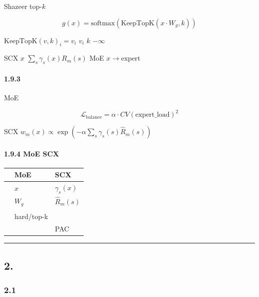 \documentclass[
  12pt,
]{article}
\begin{document}
Shazeer  top-\(k\) 

\[g(x) = \text{softmax}(\text{KeepTopK}(x \cdot W_g, k))\]

 \(\text{KeepTopK}(v, k)_i = v_i\)  \(v_i\)  \(k\) 
\(-\infty\)

SCX  \(x\) \textbf{}
\(\sum_s \gamma_s(x) R_m(s)\) MoE
\textbf{}
\(x \to \text{expert}\) 

\paragraph{1.9.3
}\label{ux8d1fux8f7dux5747ux8861ux4e0eux8f85ux52a9ux635fux5931}

 MoE 

\[\mathcal{L}_{\text{balance}} = \alpha \cdot CV(\text{expert\_load})^2\]

SCX 
\(w_m(x) \propto \exp(-\alpha \sum_s \gamma_s(s) \hat{R}_m(s))\)


\paragraph{1.9.4  MoE  SCX
}\label{ux4ece-moe-ux5230-scx-ux7684ux5deeux5f02}

\begin{longtable}[]{@{}lll@{}}
\toprule\noalign{}
 &  MoE & SCX  \\
\midrule\noalign{}
\endhead
\bottomrule\noalign{}
\endlastfoot
 &  \(x\) &  \(\gamma_s(x)\) \\
 &  \(W_g\) &  \(\hat{R}_m(s)\) \\
 &  &  \\
 & hard/top-k &  \\
 &  &  PAC  \\
\end{longtable}

\begin{center}\rule{0.5\linewidth}{0.5pt}\end{center}

\subsection{2.
}\label{ux4e09ux4e2aux547dux9898ux7684ux5b8cux6574ux8bc1ux660eux6846ux67b6}

\subsubsection{2.1
}\label{ux547dux9898ux4e00ux5168ux5c40ux4e13ux5bb6ux6392ux5e8fux4e0dux8db3}
\end{document}
